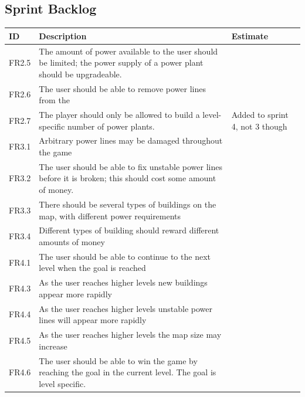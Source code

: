 \clearpage
\subsection{Sprint Backlog}
	\begin{table}
	\begin{tabular}{| p{1.2cm} | p{8cm} | p{3cm} |}
		\hline
		\rowcolor{gray}
		ID & Description & Estimate \\ \hline

		FR2.5 & The amount of power available to the user should be limited; 
		the power supply of a power plant should be upgradeable. & \\ \hline

		FR2.6 & The user should be able to remove power lines from the 
		& \\ \hline

		FR2.7 & The player should only be allowed to build a level-specific 
		number of power plants. & Added to sprint 4, not 3 though \\ \hline

		FR3.1 & Arbitrary power lines may be damaged throughout the game & \\ \hline

		FR3.2 & The user should be able to fix unstable power lines before it is 
		broken; this should cost some amount of money. & \\ \hline

		FR3.3 & There should be several types of buildings on the map, with different 
		power requirements & \\ \hline

		FR3.4 & Different types of building should reward different amounts of 
		money & \\ \hline

		FR4.1 & The user should be able to continue to the next level when the goal is 
		reached & \\ \hline

		FR4.3 & As the user reaches higher levels new buildings appear more 
		rapidly & \\ \hline

		FR4.4 & As the user reaches higher levels unstable power lines will appear 
		more rapidly & \\ \hline

		FR4.5 & As the user reaches higher levels the map size may increase & \\ \hline

		FR4.6 & The user should be able to win the game by reaching the goal in 
		the current level. The goal is level specific. & \\ \hline


\end{tabular}
\end{table}

